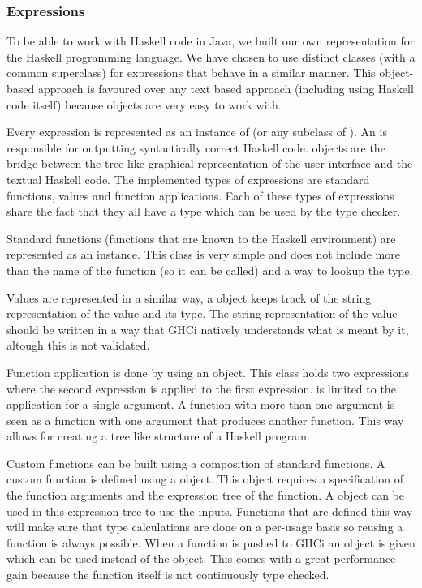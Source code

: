 \subsubsection{Expressions}
 

To be able to work with Haskell code in Java, we built our own representation for the Haskell programming language.
We have chosen to use distinct classes (with a common superclass) for expressions that behave in a similar manner.
This object-based approach is favoured over any text based approach (including using Haskell code itself) because objects are very easy to work with.

Every expression is represented as an instance of  (or any subclass of ). 
An  is responsible for outputting syntactically correct Haskell code.  objects are the bridge between the tree-like graphical representation of the user interface and the textual Haskell code.
The implemented types of expressions are standard functions, values and function applications.
Each of these types of expressions share the fact that they all have a type which can be used by the type checker.

Standard functions (functions that are known to the Haskell environment) are represented as an  instance. 
This class is very simple and does not include more than the name of the function (so it can be called) and a way to lookup the type.

Values are represented in a similar way, a  object keeps track of the string representation of the value and its type. 
The string representation of the value should be written in a way that GHCi natively understands what is meant by it, altough this is not validated.

Function application is done by using an  object. 
This class holds two expressions where the second expression is applied to the first expression.
 is limited to the application for a single argument.
A function with more than one argument is seen as a function with one argument that produces another function.
This way  allows for creating a tree like structure of a Haskell program.

Custom functions can be built using a composition of standard functions.
A custom function is defined using a  object.
This object requires a specification of the function arguments and the expression tree of the function.
A  object can be used in this expression tree to use the inputs.
Functions that are defined this way will make sure that type calculations are done on a per-usage basis so reusing a function is always possible.
When a function is pushed to GHCi an  object is given which can be used instead of the  object.
This comes with a great performance gain because the function itself is not continuously type checked.

